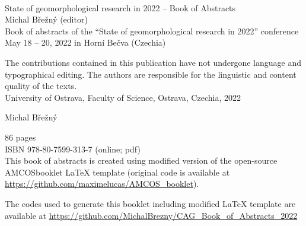 \documentclass[
	openany, %
	parskip=false, %
	12pt, %
	a4paper, %
]{conferencebooklet} %
\begin{document}


\clearpage
\setcounter{page}{1}
\thispagestyle{empty} %

~\vfill %


\begin{flushleft}	
\vspace{2em}
State of geomorphological research in 2022 -- Book of Abstracts\\
Michal Břežný (editor)\\
\vspace{2em}
Book of abstracts of the \enquote{State of geomorphological research in 2022} conference\\
May 18 – 20, 2022 in Horní Bečva (Czechia)\\
\vspace{2em}

The contributions contained in this publication have not undergone language and typographical editing. The authors are responsible for the linguistic and content quality of the texts.
\\ 
\vspace{2em}
University of Ostrava, Faculty of Science,
Ostrava, Czechia, 2022 \\\vspace{2em}

 Michal Břežný

86 pages\\
\vspace{1em}
ISBN 978-80-7599-313-7 (online; pdf)\\

\vspace{5em}
This book of abstracts is created using  modified version of the open-source AMCOS\textunderscore booklet \LaTeX{} template (original code is available at  \url{https://github.com/maximelucas/AMCOS\_booklet}).

The codes used to generate this booklet including modified \LaTeX{} template are available at \url{https://github.com/MichalBrezny/CAG_Book_of_Abstracts_2022}

\end{flushleft}
\end{document}
